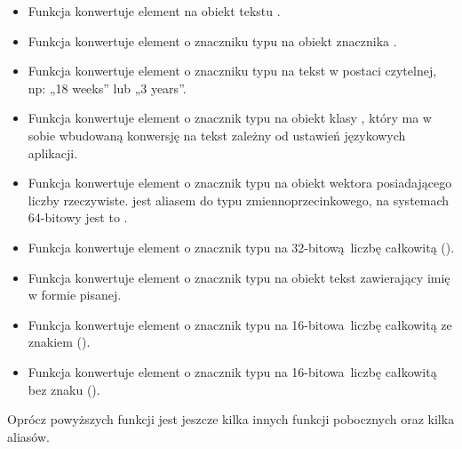 \begin{itemize}
    \item {}

          Funkcja konwertuje element na obiekt tekstu .

    \item {}

          Funkcja konwertuje element o znaczniku typu  na obiekt znacznika .

    \item {}

          Funkcja konwertuje element o znaczniku typu  na tekst w postaci czytelnej, np: „18 weeks” lub „3 years”.

    \item {}

          Funkcja konwertuje element o znacznik typu  na obiekt klasy , który ma w sobie wbudowaną konwersję na tekst zależny od ustawień językowych aplikacji.

    \item {}

          Funkcja konwertuje element o znacznik typu  na obiekt wektora posiadającego liczby rzeczywiste.
           jest aliasem do typu zmiennoprzecinkowego, na systemach 64-bitowy jest to .

    \item {}

          Funkcja konwertuje element o znacznik typu  na 32-bitową liczbę całkowitą ().

    \item {}

          Funkcja konwertuje element o znacznik typu  na obiekt tekst zawierający imię w formie pisanej.

    \item {}

          Funkcja konwertuje element o znacznik typu  na 16-bitowa liczbę całkowitą ze znakiem ().

    \item {}

          Funkcja konwertuje element o znacznik typu  na 16-bitowa liczbę całkowitą bez znaku ().

\end{itemize}
Oprócz powyższych funkcji jest jeszcze kilka innych funkcji pobocznych oraz kilka aliasów.

